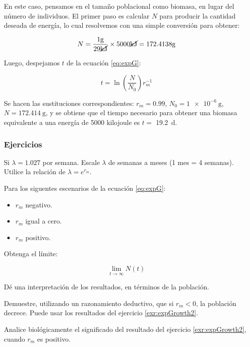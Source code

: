 \documentclass[12pt,letterpaper,]{book}
\let\BeginKnitrBlock\begin \let\EndKnitrBlock\end
\begin{document}
En este caso, pensamos en el tamaño poblacional como biomasa, en lugar
del número de individuos. El primer paso es calcular \(N\) para producir
la cantidad deseada de energía, lo cual resolvemos con una simple
conversión para obtener:

\[
N=\frac{1\si{\gram}}{29\cancel{\si{\kilo\joule}}}\times 5000 \cancel{\si{\kilo\joule}}=172.4138\si{\gram}
\]

Luego, despejamos \(t\) de la ecuación \eqref{eq:expG}:

\[
t = \ln \left(\frac{N}{N_0}\right)r_m^{-1}
\]

Se hacen las sustituciones correspondientes: \(r_m = 0.99\),
\(N_0 = \SI{1e-6}{\gram}\), \(N = \SI{172.414}{\gram}\), y se obtiene
que el tiempo necesario para obtener una biomasa equivalente a una
energía de 5000 kilojoule es \(t =\) \SI{ 19.2 }{\day}.

\subsubsection{Ejercicios}\label{ejercicios-1}

\BeginKnitrBlock{exercise}
\protect\hypertarget{exr:expGrowth1}{}{\label{exr:expGrowth1} }Si
\(\lambda = 1.027\) por semana. Escale \(\lambda\) de semanas a meses (1
mes = 4 semanas). Utilice la relación de \(\lambda = e^{r_m}\).
\EndKnitrBlock{exercise}

\BeginKnitrBlock{exercise}
\protect\hypertarget{exr:expGrowth2}{}{\label{exr:expGrowth2} }Para los
siguentes escenarios de la ecuación \eqref{eq:expG}:

\begin{itemize}
\item
  \(r_m\) negativo.
\item
  \(r_m\) igual a cero.
\item
  \(r_m\) positivo.
\end{itemize}

Obtenga el límite:

\[
  \lim_{t \to \infty } N(t)
\]

Dé una interpretación de los resultados, en términos de la población.
\EndKnitrBlock{exercise}

\BeginKnitrBlock{exercise}
\protect\hypertarget{exr:expGrowth3}{}{\label{exr:expGrowth3} }Demuestre,
utilizando un razonamiento deductivo, que si \(r_m < 0\), la población
decrece. Puede usar los resultados del ejercicio \ref{exr:expGrowth2}.
\EndKnitrBlock{exercise}

\BeginKnitrBlock{exercise}
\protect\hypertarget{exr:expGrowth4}{}{\label{exr:expGrowth4} }Analice
biológicamente el significado del resultado del ejercicio
\ref{exr:expGrowth2}, cuando \(r_m\) es positivo.
\EndKnitrBlock{exercise}
\end{document}
